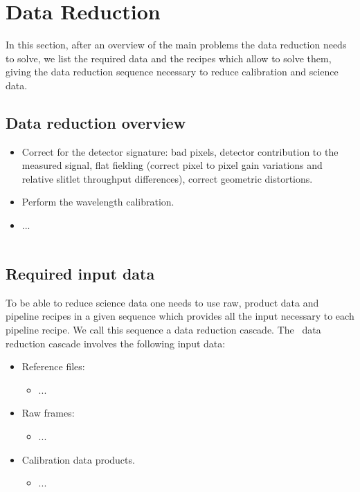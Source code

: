 \section{\label{data_reduction}Data Reduction}

In this section, after an overview of the main problems the data reduction 
needs to solve, we list the required data and the recipes which allow to 
solve them, giving the data reduction sequence necessary to reduce calibration 
and science data. 

\subsection{Data reduction overview}

\begin{itemize}
\item Correct for the detector signature: bad pixels, detector contribution 
to the measured signal, flat fielding (correct pixel to pixel gain variations 
and relative slitlet throughput differences), correct geometric distortions.
\item Perform the wavelength calibration.
\item ...

\end{itemize}
\begin{figure}[ht]
\begin{center}
\begin{tabular}{c}
\end{tabular}
\end{center}
\caption{}
\end{figure}


\subsection{Required input data}
To be able to reduce science data one needs to use raw, product data and 
pipeline recipes in a given sequence which provides all the input necessary 
to each pipeline recipe. We call this sequence a data reduction cascade. 
The \instname\, data reduction cascade involves the following input data:
\begin{itemize}
\item Reference files:
\begin{itemize}
\item ...
\end{itemize}
\item Raw frames:
\begin{itemize}
\item ...
\end{itemize}
\item Calibration data products.
\begin{itemize}
\item ... 
\end{itemize}
\end{itemize}



